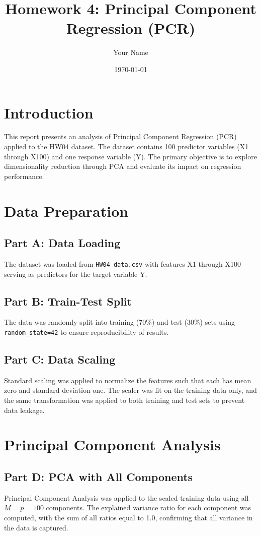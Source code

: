 \documentclass[11pt]{article}
\title{Homework 4: Principal Component Regression (PCR)}
\author{Your Name}
\date{\today}
\begin{document}
\maketitle

\section{Introduction}
This report presents an analysis of Principal Component Regression (PCR) applied to the HW04 dataset. The dataset contains 100 predictor variables (X1 through X100) and one response variable (Y). The primary objective is to explore dimensionality reduction through PCA and evaluate its impact on regression performance.

\section{Data Preparation}

\subsection{Part A: Data Loading}
The dataset was loaded from \texttt{HW04\_data.csv} with features X1 through X100 serving as predictors for the target variable Y.

\subsection{Part B: Train-Test Split}
The data was randomly split into training (70\%) and test (30\%) sets using \texttt{random\_state=42} to ensure reproducibility of results.

\subsection{Part C: Data Scaling}
Standard scaling was applied to normalize the features such that each has mean zero and standard deviation one. The scaler was fit on the training data only, and the same transformation was applied to both training and test sets to prevent data leakage.

\section{Principal Component Analysis}

\subsection{Part D: PCA with All Components}
Principal Component Analysis was applied to the scaled training data using all $M = p = 100$ components. The explained variance ratio for each component was computed, with the sum of all ratios equal to 1.0, confirming that all variance in the data is captured.
\end{document}
